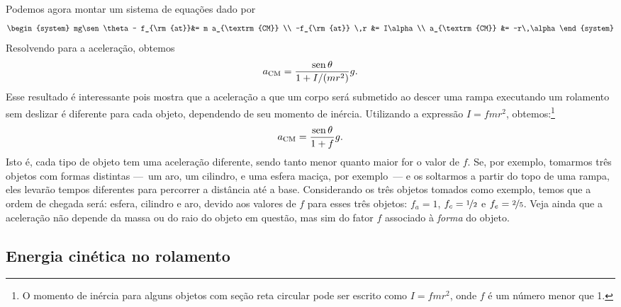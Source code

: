 Podemos agora montar um sistema de equações dado por
\begin{equation}
\begin{system}
    mg\sen\theta - f_{\rm{at}}&= m a_{\textrm{CM}} \\
    -f_{\rm{at}} \,r &= I\alpha \\
    a_{\textrm{CM}} &= -r\,\alpha
\end{system}
\end{equation}
%
Resolvendo para a aceleração, obtemos
\begin{equation}
  a_{\textrm{CM}} = \frac{\operatorname{sen}\theta}{1+I/(mr^2)} g.
\end{equation}
%
Esse resultado é interessante pois mostra que a aceleração a que um corpo será submetido ao descer uma rampa executando um rolamento sem deslizar é diferente para cada objeto, dependendo de seu momento de inércia. Utilizando a expressão $I = f mr^2$, obtemos:\footnote{O momento de inércia para alguns objetos com seção reta circular pode ser escrito como $I = f mr^2$, onde $f$ é um número menor que 1.}
\begin{equation}
  a_{\textrm{CM}} = \frac{\operatorname{sen}\theta}{1+f} g.
\end{equation}
%
Isto é, cada tipo de objeto tem uma aceleração diferente, sendo tanto menor quanto maior for o valor de $f$. Se, por exemplo, tomarmos três objetos com formas distintas ---~um aro, um cilindro, e uma esfera maciça, por exemplo~--- e os soltarmos a partir do topo de uma rampa, eles levarão tempos diferentes para percorrer a distância até a base. Considerando os três objetos tomados como exemplo, temos que a ordem de chegada será: esfera, cilindro e aro, devido aos valores de $f$ para esses três objetos: $f_a = 1$, $f_c = \nicefrac{1}{2}$ e $f_e = \nicefrac{2}{5}$. Veja ainda que a aceleração não depende da massa ou do raio do objeto em questão, mas sim do fator $f$ associado à \emph{forma} do objeto.

\subsection{Energia cinética no rolamento}


